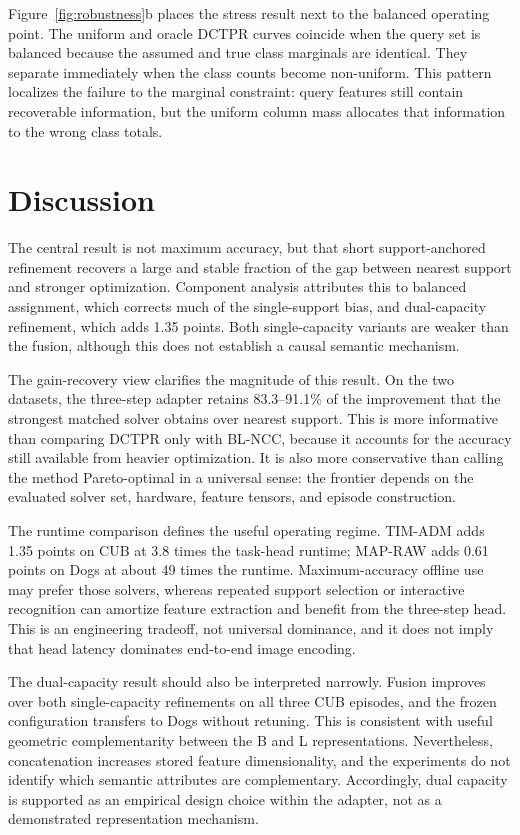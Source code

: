 \documentclass[10pt,twocolumn]{article}
\newcommand{\method}{\textsc{DCTPR}\xspace}
\begin{document}
Figure~\ref{fig:robustness}b places the stress result next to the balanced
operating point. The uniform and oracle DCTPR curves coincide when the query set
is balanced because the assumed and true class marginals are identical. They
separate immediately when the class counts become non-uniform. This pattern
localizes the failure to the marginal constraint: query features still contain
recoverable information, but the uniform column mass allocates that information
to the wrong class totals.

\section{Discussion}
\label{sec:discussion}

The central result is not maximum accuracy, but that short support-anchored
refinement recovers a large and stable fraction of the gap between nearest
support and stronger optimization. Component analysis attributes this to
balanced assignment, which corrects much of the single-support bias, and
dual-capacity refinement, which adds 1.35 points. Both single-capacity variants
are weaker than the fusion, although this does not establish a causal semantic
mechanism.

The gain-recovery view clarifies the magnitude of this result. On the two
datasets, the three-step adapter retains 83.3--91.1\% of the improvement that
the strongest matched solver obtains over nearest support. This is more
informative than comparing \method only with BL-NCC, because it accounts for
the accuracy still available from heavier optimization. It is also more
conservative than calling the method Pareto-optimal in a universal sense: the
frontier depends on the evaluated solver set, hardware, feature tensors, and
episode construction.

The runtime comparison defines the useful operating regime. TIM-ADM adds 1.35
points on CUB at 3.8 times the task-head runtime; MAP-RAW adds 0.61 points on
Dogs at about 49 times the runtime. Maximum-accuracy offline use may prefer
those solvers, whereas repeated support selection or interactive recognition
can amortize feature extraction and benefit from the three-step head. This is
an engineering tradeoff, not universal dominance, and it does not imply that
head latency dominates end-to-end image encoding.

The dual-capacity result should also be interpreted narrowly. Fusion improves
over both single-capacity refinements on all three CUB episodes, and the frozen
configuration transfers to Dogs without retuning. This is consistent with
useful geometric complementarity between the B and L representations.
Nevertheless, concatenation increases stored feature dimensionality, and the
experiments do not identify which semantic attributes are complementary.
Accordingly, dual capacity is supported as an empirical design choice within
the adapter, not as a demonstrated representation mechanism.
\end{document}
